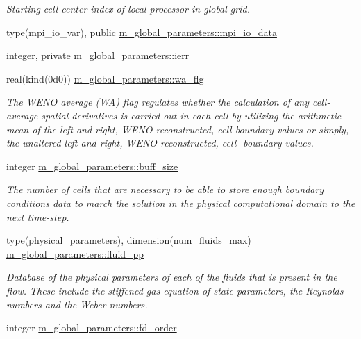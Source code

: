 \begin{DoxyCompactItemize}
\begin{DoxyCompactList}\small\item\em Starting cell-\/center index of local processor in global grid. \end{DoxyCompactList}\item 
type(mpi\+\_\+io\+\_\+var), public \hyperlink{namespacem__global__parameters_ad80f68aac31aa898ab2d7729f60e375f}{m\+\_\+global\+\_\+parameters\+::mpi\+\_\+io\+\_\+data}
\item 
integer, private \hyperlink{namespacem__global__parameters_a46461347b5094736adfa94ef005b49a6}{m\+\_\+global\+\_\+parameters\+::ierr}
\item 
real(kind(0d0)) \hyperlink{namespacem__global__parameters_ac4851cbb47e6541bfcf40706bd08eee6}{m\+\_\+global\+\_\+parameters\+::wa\+\_\+flg}
\begin{DoxyCompactList}\small\item\em The W\+E\+NO average (WA) flag regulates whether the calculation of any cell-\/ average spatial derivatives is carried out in each cell by utilizing the arithmetic mean of the left and right, W\+E\+N\+O-\/reconstructed, cell-\/boundary values or simply, the unaltered left and right, W\+E\+N\+O-\/reconstructed, cell-\/ boundary values. \end{DoxyCompactList}\item 
integer \hyperlink{namespacem__global__parameters_a6e342ae3eb66f89e0eeb94e11aa42d92}{m\+\_\+global\+\_\+parameters\+::buff\+\_\+size}
\begin{DoxyCompactList}\small\item\em The number of cells that are necessary to be able to store enough boundary conditions data to march the solution in the physical computational domain to the next time-\/step. \end{DoxyCompactList}\item 
type(physical\+\_\+parameters), dimension(num\+\_\+fluids\+\_\+max) \hyperlink{namespacem__global__parameters_a7297abec8863ecabf95e24ebdae46a17}{m\+\_\+global\+\_\+parameters\+::fluid\+\_\+pp}
\begin{DoxyCompactList}\small\item\em Database of the physical parameters of each of the fluids that is present in the flow. These include the stiffened gas equation of state parameters, the Reynolds numbers and the Weber numbers. \end{DoxyCompactList}\item 
integer \hyperlink{namespacem__global__parameters_a8892cc67c7d04be4d8e6d02a86e209bc}{m\+\_\+global\+\_\+parameters\+::fd\+\_\+order}

\end{DoxyCompactItemize}

